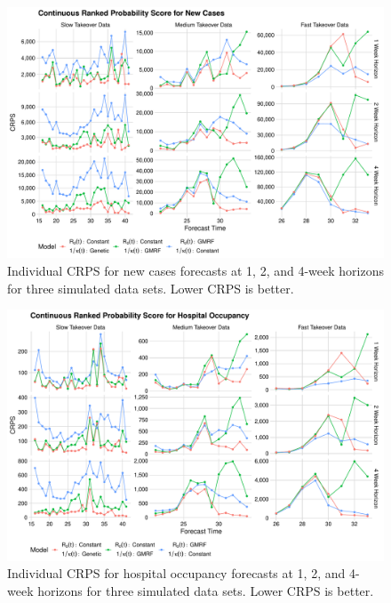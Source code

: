 \begin{figure}
    \centering
    \includegraphics[width=1.0\columnwidth]{simulated_crps_comparison_data_new_cases_plot}
    \caption{Individual CRPS for new cases forecasts at 1, 2, and 4-week horizons for three simulated data sets. Lower CRPS is better.}
    \label{ch_5:fig:simulated_crps_comparison_data_new_cases_plot}
\end{figure}

\begin{figure}
    \centering
    \includegraphics[width=1.0\columnwidth]{simulated_crps_comparison_data_hospitalizations_plot}
    \caption{Individual CRPS for hospital occupancy forecasts at 1, 2, and 4-week horizons for three simulated data sets. Lower CRPS is better.}
    \label{ch_5:fig:simulated_crps_comparison_data_hospitalizations_plot}
\end{figure}

